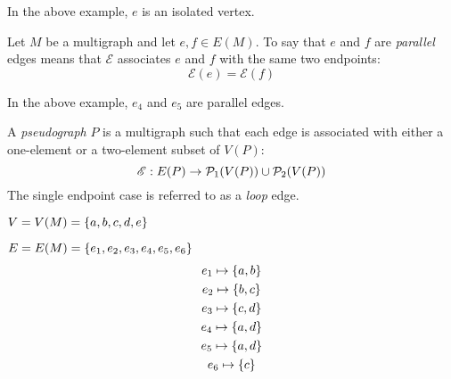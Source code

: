 \documentclass[letterpaper,12pt,fleqn]{article}
\newcommand{\E}{\mathscr{E}}
\begin{document}
In the above example, \(e\) is an isolated vertex.

\begin{definition}
  Let \(M\) be a multigraph and let \(e,f\in E(M)\).  To say that \(e\) and \(f\) are \emph{parallel} edges
  means that \(\E\) associates \(e\) and \(f\) with the same two endpoints:
  \[\E(e)=\E(f)\]
\end{definition}

In the above example, \(e_4\) and \(e_5\) are parallel edges.

\begin{definition}[Pseudograph]
  A \emph{pseudograph} \(P\) is a multigraph such that each edge is associated with either a one-element or a
  two-element subset of \(V(P)\):
  \[\E:E(P)\to\ps_1(V(P))\cup\ps_2(V(P))\]
  The single endpoint case is referred to as a \emph{loop} edge.
\end{definition}

\begin{example}
  \begin{minipage}[t]{3.25in}
    \vspace{0cm}
  \end{minipage}
  \begin{minipage}[t]{3in}
    \vspace{0.1in}
    \(V=V(M)=\{a,b,c,d,e\}\)

    \(E=E(M)=\{e_1,e_2,e_3,e_4,e_5,e_6\}\)
    \begin{gather*}
      e_1\mapsto\{a,b\} \\
      e_2\mapsto\{b,c\} \\
      e_3\mapsto\{c,d\} \\
      e_4\mapsto\{a,d\} \\
      e_5\mapsto\{a,d\} \\
      e_6\mapsto\{c\}
    \end{gather*}
  \end{minipage}
\end{example}
\end{document}
